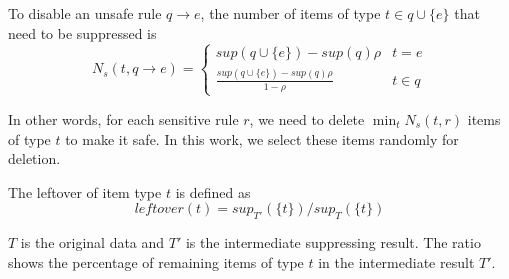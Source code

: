 \begin{definition}
\label{minimum}
To disable an unsafe rule $q \rightarrow e$, the number of items of type
$t \in q\cup\{e\}$ that need to be suppressed is
\[N_s(t, q\rightarrow e)=
\begin{cases}
sup(q\cup \{e\})-sup(q)\rho & t=e  \\
\frac{sup(q\cup \{e\})-sup(q)\rho}{1-\rho} & t\in q %
\end{cases} \]
\end{definition}

In other words, for each sensitive rule $r$, 
we need to delete $\min_t N_s(t, r)$ items of type $t$ to make it safe. 
In this work, we select these items randomly for deletion.

\begin{definition}
 The leftover of item type $t$ is defined as
\[ leftover(t)={sup_{T'}(\{t\})}/{sup_T(\{t\})} \]
\end{definition}
$T$ is the original data and $T'$ is the intermediate suppressing result.
The ratio shows the percentage of remaining items of type $t$
in the intermediate result $T'$.


